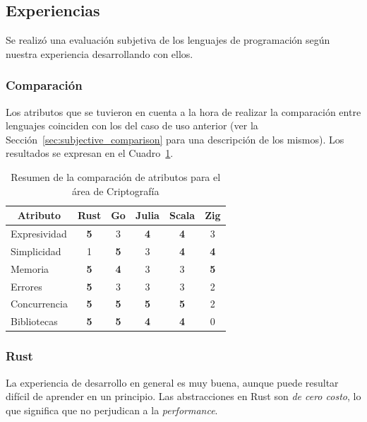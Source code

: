 \documentclass[11pt]{article}
\let\Oldsubsection\subsection
\renewcommand{\subsection}{\FloatBarrier\Oldsubsection}
\let\Oldsubsubsection\subsubsection
\renewcommand{\subsubsection}{\FloatBarrier\Oldsubsubsection}
\newcommand{\badMetric}[1]{{\color{BrickRed}#1}}
\newcommand{\goodMetric}[1]{{\textbf{#1}}}
\newcommand{\english}[1]{\textit{#1}}
\newcommand{\technical}[1]{\textit{#1}}
\begin{document}
\subsection{Experiencias}

Se realizó una evaluación subjetiva de los lenguajes de programación según nuestra experiencia desarrollando con ellos.

\subsubsection{Comparación}

Los atributos que se tuvieron en cuenta a la hora de realizar la comparación entre lenguajes coinciden con los del caso de uso anterior (ver la Sección~\ref{sec:subjective_comparison} para una descripción de los mismos).
Los resultados se expresan en el Cuadro~\ref{tab:aes:experiences}.

\begin{table}[h]
\centering
\begin{tabular}{|l|c|c|c|c|c|}
\hline
\multicolumn{1}{|c|}{Atributo} & Rust & Go & Julia & Scala & Zig \\ \hline
Expresividad & \goodMetric{5} & 3 & \goodMetric{4} & \goodMetric{4} & 3 \\ \hline
Simplicidad & \badMetric{1} & \goodMetric{5} & 3 & \goodMetric{4} & \goodMetric{4} \\ \hline
Memoria & \goodMetric{5} & \goodMetric{4} & 3 & 3 & \goodMetric{5} \\ \hline
Errores & \goodMetric{5} & 3 & 3 & 3 & \badMetric{2} \\ \hline
Concurrencia & \goodMetric{5} & \goodMetric{5} & \goodMetric{5} & \goodMetric{5} & \badMetric{2} \\ \hline
Bibliotecas & \goodMetric{5} & \goodMetric{5} & \goodMetric{4} & \goodMetric{4} & \badMetric{0} \\ \hline
\end{tabular}
\caption{Resumen de la comparación de atributos para el área de Criptografía}
\label{tab:aes:experiences}
\end{table}

\subsubsection{Rust}

La experiencia de desarrollo en general es muy buena, aunque puede resultar difícil de aprender en un principio. Las abstracciones en Rust son \technical{de cero costo}, lo que significa que no perjudican a la \english{performance}.
\end{document}
